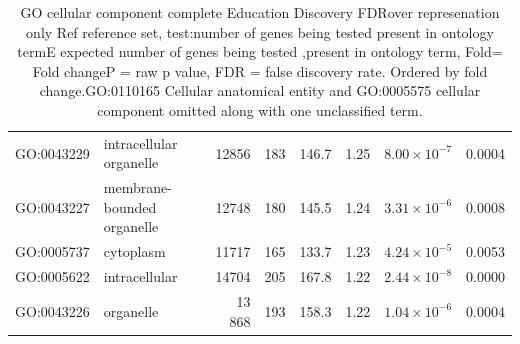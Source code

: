 \begin{table}[ht]
\begin{adjustbox}{width=\textwidth}
\begin{tabular}{llrrrrrr}
  GO:0043229 & intracellular organelle  & 12856 & 183 & 146.7 & 1.25 & $8.00 \times 10^{-7}$ & 0.0004 \\ 
  GO:0043227 & membrane-bounded organelle  & 12748 & 180 & 145.5 & 1.24 & $3.31 \times 10^{-6}$ & 0.0008 \\ 
  GO:0005737 & cytoplasm  & 11717 & 165 & 133.7 & 1.23 & $4.24 \times 10^{-5}$ & 0.0053 \\ 
  GO:0005622 & intracellular  & 14704 & 205 & 167.8 & 1.22 & $2.44 \times 10^{-8}$ & 0.0000 \\ 
  GO:0043226 & organelle  & 13  868 & 193 & 158.3 & 1.22 & $1.04 \times 10^{-6}$ & 0.0004 \\ 
   \hline
\end{tabular}
\end{adjustbox}
\caption{GO cellular component complete Education Discovery FDRover represenation only  Ref reference set, test:number of genes being tested present in ontology termE expected number of genes being tested ,present in ontology term, Fold= Fold changeP = raw p value, FDR = false discovery rate. Ordered by fold change.GO:0110165 Cellular anatomical entity and GO:0005575 cellular component omitted along with one unclassified term. } 
\label{tab:GO cellular component complete Education Discovery FDRover represenation only}
\end{table}
        
